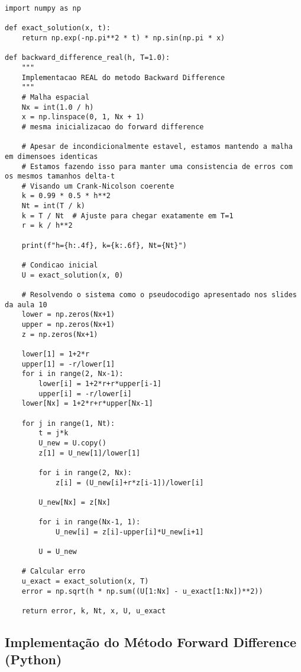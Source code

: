 \documentclass[10pt,twocolumn]{article}
\begin{document}
\begin{verbatim}
import numpy as np

def exact_solution(x, t):
    return np.exp(-np.pi**2 * t) * np.sin(np.pi * x)

def backward_difference_real(h, T=1.0):
    """
    Implementacao REAL do metodo Backward Difference
    """
    # Malha espacial
    Nx = int(1.0 / h)
    x = np.linspace(0, 1, Nx + 1)
    # mesma inicializacao do forward difference

    # Apesar de incondicionalmente estavel, estamos mantendo a malha em dimensoes identicas
    # Estamos fazendo isso para manter uma consistencia de erros com os mesmos tamanhos delta-t
    # Visando um Crank-Nicolson coerente
    k = 0.99 * 0.5 * h**2
    Nt = int(T / k)
    k = T / Nt  # Ajuste para chegar exatamente em T=1
    r = k / h**2

    print(f"h={h:.4f}, k={k:.6f}, Nt={Nt}")

    # Condicao inicial
    U = exact_solution(x, 0)

    # Resolvendo o sistema como o pseudocodigo apresentado nos slides da aula 10
    lower = np.zeros(Nx+1)
    upper = np.zeros(Nx+1)
    z = np.zeros(Nx+1)

    lower[1] = 1+2*r
    upper[1] = -r/lower[1]
    for i in range(2, Nx-1):
        lower[i] = 1+2*r+r*upper[i-1]
        upper[i] = -r/lower[i]
    lower[Nx] = 1+2*r+r*upper[Nx-1]

    for j in range(1, Nt):
        t = j*k
        U_new = U.copy()
        z[1] = U_new[1]/lower[1]

        for i in range(2, Nx):
            z[i] = (U_new[i]+r*z[i-1])/lower[i]

        U_new[Nx] = z[Nx]

        for i in range(Nx-1, 1):
            U_new[i] = z[i]-upper[i]*U_new[i+1]

        U = U_new

    # Calcular erro
    u_exact = exact_solution(x, T)
    error = np.sqrt(h * np.sum((U[1:Nx] - u_exact[1:Nx])**2))

    return error, k, Nt, x, U, u_exact
\end{verbatim}

\newpage

\subsection*{Implementação do Método Forward Difference (Python)}
\end{document}
